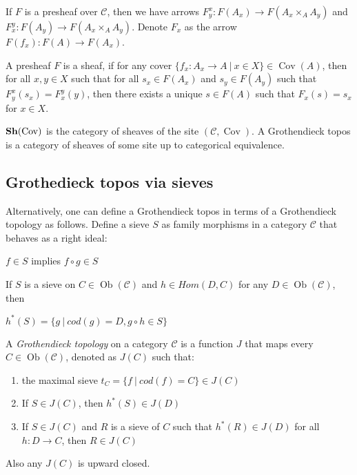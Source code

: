\documentclass[a4paper]{article}
\theoremstyle{defin}
\theoremstyle{theorem}
\theoremstyle{claim}
\theoremstyle{prop}
\theoremstyle{lemma}
\theoremstyle{fact}
\theoremstyle{ex}
\theoremstyle{col}
\begin{document}
\centerline{
}

If $F$ is a presheaf over $\mathcal{C}$, then we have arrows $F^x_y : F(A_x) \to F(A_x \times_A A_y)$ and $F^y_x : F(A_y) \to F(A_x \times_A A_y)$. Denote $F_x$ as the arrow $F(f_x) : F(A) \to F(A_x)$.



A presheaf $F$ is a sheaf, if for any cover $\{ f_x : A_x \to A \: | \: x \in X \} \in \operatorname{Cov}(A)$, then for all $x, y \in X$ such that for all $s_x \in F(A_x)$ and $s_y \in F(A_y)$ such that $F^x_y(s_x) = F^y_x(y)$, then there exists a unique $s \in F(A)$ such that $F_x(s) = s_x$ for $x \in X$.

${\bf Sh}(\operatorname{Cov})$ is the category of sheaves of the site $(\mathcal{C}, \operatorname{Cov})$. A Grothendieck topos is a category of sheaves of some site up to categorical equivalence.

\subsection{Grothedieck topos via sieves}

Alternatively, one can define a Grothendieck topos in terms of a Grothendieck topology as follows. Define a sieve $S$
as family morphisms in a category $\mathcal{C}$ that behaves as a right ideal:

\begin{center}
$f \in S$ implies $f \circ g \in S$
\end{center}

If $S$ is a sieve on $C \in \operatorname{Ob}(\mathcal{C})$ and $h \in Hom(D, C)$ for any $D \in \operatorname{Ob}(\mathcal{C})$, then
\begin{center}
$h^*(S) = \{ g \: | \: cod(g) = D, g \circ h \in S \}$
\end{center}

A \emph{Grothendieck topology} on a category $\mathcal{C}$ is a function $J$ that maps every $C \in \operatorname{Ob}(\mathcal{C})$, denoted as $J(C)$ such that:
\begin{enumerate}
\item the maximal sieve $t_C = \{ f \: | \: cod(f) = C\} \in J(C)$
\item If $S \in J(C)$, then $h^*(S) \in J(D)$
\item If $S \in J(C)$ and $R$ is a sieve of $C$ such that $h^*(R) \in J(D)$ for all $h : D \to C$, then $R \in J(C)$
\end{enumerate}
Also any $J(C)$ is upward closed.
\end{document}
